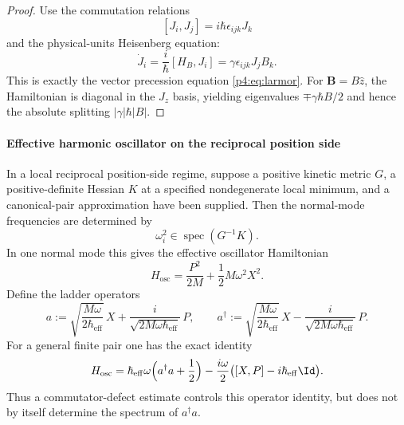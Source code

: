 \documentclass[12pt,a4paper]{article}
\begin{document}
\begin{proof}
\leavevmode\par\noindent
Use the commutation relations
\[
  [J_i,J_j]=i\hbar\epsilon_{ijk}J_k
\]
and the physical-units Heisenberg equation:
\[
\dot J_i
=
\frac{i}{\hbar}[H_B,J_i]
=
\gamma\epsilon_{ijk}J_jB_k.
\]
This is exactly the vector precession equation \eqref{p4:eq:larmor}.  For
\(\mathbf B=B\hat z\), the Hamiltonian is diagonal in the \(J_z\) basis,
yielding eigenvalues \(\mp\gamma\hbar B/2\) and hence the absolute splitting
\(|\gamma|\hbar|B|\).
\end{proof}



\paragraph{Effective harmonic oscillator on the reciprocal position side}
\label{p4:sec:part2-oscillator}

In a local reciprocal position-side regime, suppose a positive kinetic metric
\(G\), a positive-definite Hessian \(K\) at a specified nondegenerate local
minimum, and a canonical-pair approximation have been supplied.  Then the
normal-mode frequencies are determined by
\[
  \omega_i^2\in\operatorname{spec}(G^{-1}K).
\]
In one normal mode this gives the effective oscillator Hamiltonian
\begin{equation}
\label{p4:eq:oscillator-H}
H_{\mathrm{osc}}=\frac{P^2}{2M}+\frac12 M\omega^2 X^2.
\end{equation}
Define the ladder operators
\begin{equation}
\label{p4:eq:oscillator-a}
a:=\sqrt{\frac{M\omega}{2\hbar_{\mathrm{eff}}}}\,X + \frac{i}{\sqrt{2M\omega\hbar_{\mathrm{eff}}}}\,P,
\qquad
a^{\dagger}:=\sqrt{\frac{M\omega}{2\hbar_{\mathrm{eff}}}}\,X - \frac{i}{\sqrt{2M\omega\hbar_{\mathrm{eff}}}}\,P.
\end{equation}
For a general finite pair one has the exact identity
\begin{equation}
\label{p4:eq:oscillator-spectrum}
H_{\mathrm{osc}}
=\hbar_{\mathrm{eff}}\omega\Bigl(a^{\dagger}a+\frac12\Bigr)
-\frac{i\omega}{2}
\bigl([X,P]-i\hbar_{\mathrm{eff}}\Id\bigr).
\end{equation}
Thus a commutator-defect estimate controls this operator identity, but does not
by itself determine the spectrum of \(a^\dagger a\).
\end{document}
